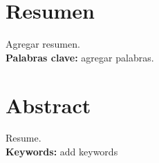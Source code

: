 
	
\begin{minipage}{\textwidth}


	\section*{ Resumen}
		
	
	
	\justifying
	\noindent Agregar resumen.\\
	\textbf{Palabras clave:} agregar palabras.
	
	
	\vspace{1cm}
	
	\section*{Abstract}
	\justifying
	\noindent Resume.\\
	\textbf{Keywords:} add keywords


\end{minipage}
